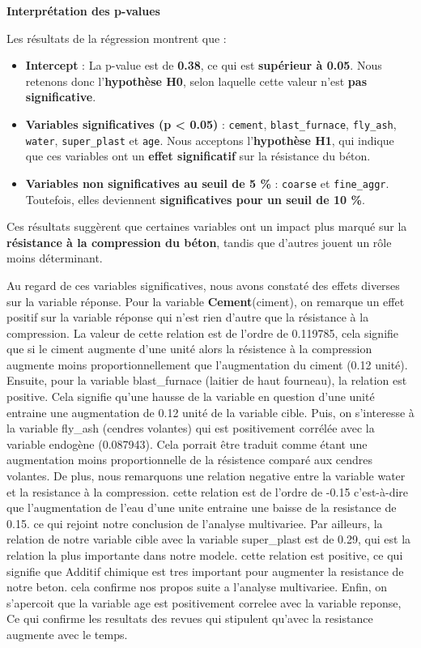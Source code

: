 \documentclass[
  12pt,
]{article}
\providecommand{\tightlist}{%
  \setlength{\itemsep}{0pt}\setlength{\parskip}{0pt}}
\begin{document}
\textbf{Interprétation des p-values}

Les résultats de la régression montrent que :

\begin{itemize}
\tightlist
\item
  \textbf{Intercept} : La p-value est de \textbf{0.38}, ce qui est
  \textbf{supérieur à 0.05}. Nous retenons donc l'\textbf{hypothèse H0},
  selon laquelle cette valeur n'est \textbf{pas significative}.
\item
  \textbf{Variables significatives (p \textless{} 0.05)} :
  \texttt{cement}, \texttt{blast\_furnace}, \texttt{fly\_ash},
  \texttt{water}, \texttt{super\_plast} et \texttt{age}. Nous acceptons
  l'\textbf{hypothèse H1}, qui indique que ces variables ont un
  \textbf{effet significatif} sur la résistance du béton.
\item
  \textbf{Variables non significatives au seuil de 5 \%} :
  \texttt{coarse} et \texttt{fine\_aggr}. Toutefois, elles deviennent
  \textbf{significatives pour un seuil de 10 \%}.
\end{itemize}

Ces résultats suggèrent que certaines variables ont un impact plus
marqué sur la \textbf{résistance à la compression du béton}, tandis que
d'autres jouent un rôle moins déterminant.

Au regard de ces variables significatives, nous avons constaté des
effets diverses sur la variable réponse. Pour la variable
\textbf{Cement}(ciment), on remarque un effet positif sur la variable
réponse qui n'est rien d'autre que la résistance à la compression. La
valeur de cette relation est de l'ordre de 0.119785, cela signifie que
si le ciment augmente d'une unité alors la résistence à la compression
augmente moins proportionnellement que l'augmentation du ciment (0.12
unité). Ensuite, pour la variable blast\_furnace (laitier de haut
fourneau), la relation est positive. Cela signifie qu'une hausse de la
variable en question d'une unité entraine une augmentation de 0.12 unité
de la variable cible. Puis, on s'interesse à la variable fly\_ash
(cendres volantes) qui est positivement corrélée avec la variable
endogène (0.087943). Cela porrait être traduit comme étant une
augmentation moins proportionnelle de la résistence comparé aux cendres
volantes. De plus, nous remarquons une relation negative entre la
variable water et la resistance à la compression. cette relation est de
l'ordre de -0.15 c'est-à-dire que l'augmentation de l'eau d'une unite
entraine une baisse de la resistance de 0.15. ce qui rejoint notre
conclusion de l'analyse multivariee. Par ailleurs, la relation de notre
variable cible avec la variable super\_plast est de 0.29, qui est la
relation la plus importante dans notre modele. cette relation est
positive, ce qui signifie que Additif chimique est tres important pour
augmenter la resistance de notre beton. cela confirme nos propos suite a
l'analyse multivariee. Enfin, on s'apercoit que la variable age est
positivement correlee avec la variable reponse, Ce qui confirme les
resultats des revues qui stipulent qu'avec la resistance augmente avec
le temps.
\end{document}
